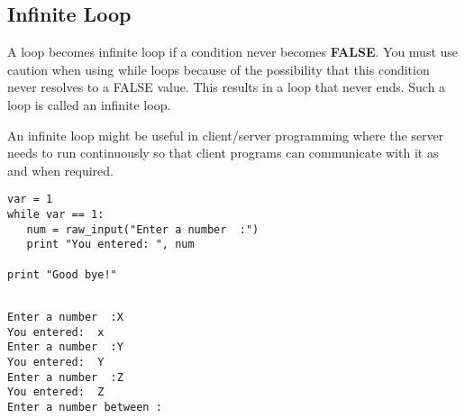 \subsection{Infinite Loop}
A loop becomes {\color{red}infinite loop} if a condition never becomes {\textbf{FALSE}}. You must use caution when using while loops because of the possibility that this condition never resolves to a FALSE value. This results in a loop that never ends. Such a loop is called an infinite loop.

An infinite loop might be useful in client/server programming where the server needs to run continuously so that client programs can communicate with it as and when required.
\begin{framed}
\begin{verbatim}
var = 1
while var == 1:
   num = raw_input("Enter a number  :")
   print "You entered: ", num

print "Good bye!"
\end{verbatim}
\end{framed}

\begin{shaded}
\begin{verbatim}

Enter a number  :X
You entered:  x
Enter a number  :Y
You entered:  Y
Enter a number  :Z
You entered:  Z
Enter a number between :

\end{verbatim}
\end{shaded}

